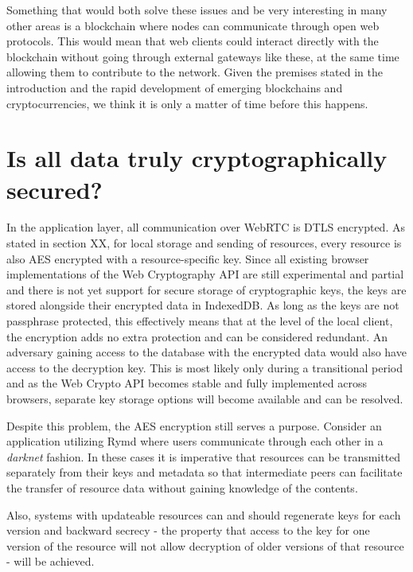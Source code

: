 Something that would both solve these issues and be very interesting in many other areas is a blockchain where nodes can communicate through open web protocols. This would mean that web clients could interact directly with the blockchain without going through external gateways like these, at the same time allowing them to contribute to the network. Given the premises stated in the introduction and the rapid development of emerging blockchains and cryptocurrencies, we think it is only a matter of time before this happens.

\section{Is all data truly cryptographically secured?}
In the application layer, all communication over WebRTC is DTLS encrypted. As stated in section XX, for local storage and sending of resources, every resource is also AES encrypted with a resource-specific key. Since all existing browser implementations of the Web Cryptography API are still experimental and partial and there is not yet support for secure storage of cryptographic keys, the keys are stored alongside their encrypted data in IndexedDB. As long as the keys are not passphrase protected, this effectively means that at the level of the local client, the encryption adds no extra protection and can be considered redundant. An adversary gaining access to the database with the encrypted data would also have access to the decryption key. This is most likely only during a transitional period and as the Web Crypto API becomes stable and fully implemented across browsers, separate key storage options will become available and can be resolved.

Despite this problem, the AES encryption still serves a purpose. Consider an application utilizing Rymd where users communicate through each other in a \emph{darknet} fashion. In these cases it is imperative that resources can be transmitted separately from their keys and metadata so that intermediate peers can facilitate the transfer of resource data without gaining knowledge of the contents.

Also, systems with updateable resources can and should regenerate keys for each version and backward secrecy - the property that access to the key for one version of the resource will not allow decryption of older versions of that resource - will be achieved.

